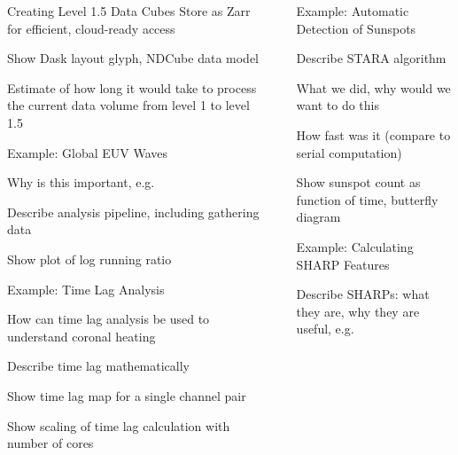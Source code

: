 \documentclass[final]{beamer}
\newlength{\sepwidth}
\newlength{\colwidth}
\newcommand{\separatorcolumn}{\begin{column}{\sepwidth}\end{column}}
\begin{document}
\begin{frame}[t]
\begin{columns}[t]
\begin{column}{\colwidth}
\begin{block}{Creating Level 1.5 Data Cubes}
    Store as Zarr for efficient, cloud-ready access

    Show Dask layout glyph, NDCube data model

    Estimate of how long it would take to process the current data volume from level 1 to level 1.5

  \end{block}

  \begin{block}{Example: Global EUV Waves}

    Why is this important, e.g. \citet{liu_truly_2018}

    Describe analysis pipeline, including gathering data

    Show plot of log running ratio

  \end{block}

  \begin{block}{Example: Time Lag Analysis}

    How can time lag analysis be used to understand coronal heating \citet{viall_evidence_2012}

    Describe time lag mathematically \citet{barnes_understanding_2019}

    Show time lag map for a single channel pair

    Show scaling of time lag calculation with number of cores

  \end{block}

\end{column}

\separatorcolumn

\begin{column}{\colwidth}

  \begin{block}{Example: Automatic Detection of Sunspots}

    Describe STARA algorithm \citet{watson_modelling_2009}

    What we did, why would we want to do this

    How fast was it (compare to serial computation)

    Show sunspot count as function of time, butterfly diagram

  \end{block}

  \begin{block}{Example: Calculating SHARP Features}

    Describe SHARPs: what they are, why they are useful, e.g. \citet{bobra_helioseismic_2014}


\end{block}
\end{column}
\end{columns}
\end{frame}
\end{document}
